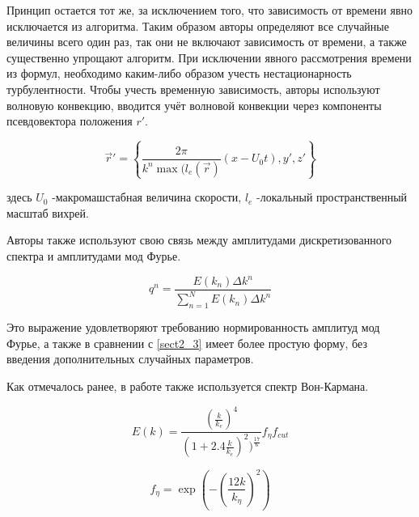 Принцип остается тот же, за исключением того, что зависимость от времени явно исключается из алгоритма. Таким образом авторы определяют все случайные величины всего один раз, так они не включают зависимость от времени, а также существенно упрощают алгоритм. При исключении явного рассмотрения времени из формул, необходимо каким-либо образом учесть нестационарность турбулентности. Чтобы учесть временную зависимость, авторы используют волновую конвекцию, вводится учёт волновой конвекции через компоненты псевдовектора положения $r'$.

\begin{equation}
    \label{eq:spectral_equation21}
    \vec r' = \left\{ \frac{2 \pi}{k^n \max{(l_e(\vec r)}} (x - U_0 t), y', z'\right\}
\end{equation}

здесь $U_0$ -макромашстабная величина скорости, $l_e$ -локальный пространственный масштаб вихрей.

Авторы также используют свою связь между амплитудами дискретизованного спектра и амплитудами мод Фурье.

\begin{equation}
    \label{eq:spectral_equation21_2}
    q^n = \frac{E(k_n) \Delta k^n}{\sum_{n=1}^N E(k_n) \Delta k^n}
\end{equation}

Это выражение удовлетворяют требованию нормированность амплитуд мод Фурье, а также в сравнении с \ref{sect2_3} имеет более простую форму, без введения дополнительных случайных параметров.

Как отмечалось ранее, в работе также используется спектр Вон-Кармана.

\begin{equation}
    \label{eq:spectral_equation22}
    E(k) = \frac{(\frac{k}{k_e})^4}{(1 + 2.4 \frac{k}{k_e})^2) ^ {\frac{17}{6}}} f_{\eta} f_{cut} 
\end{equation}

\begin{equation}
    \label{eq:spectral_equation23}
    f_{\eta} = \exp{(-(\frac{12 k}{k_\eta})^2)} 
\end{equation}

